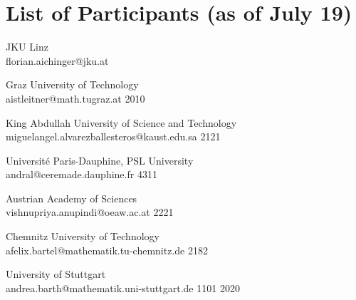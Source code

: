 \chapter{List of Participants (as of July 19)}
%
\setlength{\columnsep}{1cm}
\begin{multicols}{2}
\small\raggedright
%


 {JKU Linz\\}%
 {florian.aichinger@jku.at}%
 {} %
 {} %
 {} %
 {} %
 {} %

 {Graz University of Technology\\}%
 {aistleitner@math.tugraz.at}%
 {2010} %
 {} %
 {} %
 {} %
 {} %

 {King Abdullah University of Science and Technology\\}%
 {miguelangel.alvarezballesteros@kaust.edu.sa}%
 {2121} %
 {} %
 {} %
 {} %
 {} %

 {Universit\'{e} Paris-Dauphine, PSL University\\}%
 {andral@ceremade.dauphine.fr}%
 {4311} %
 {} %
 {} %
 {} %
 {} %

 {Austrian Academy of Sciences\\}%
 {vishnupriya.anupindi@oeaw.ac.at}%
 {2221} %
 {} %
 {} %
 {} %
 {} %

 {Chemnitz University of Technology\\}%
 {afelix.bartel@mathematik.tu-chemnitz.de}%
 {2182} %
 {} %
 {} %
 {} %
 {} %

 {University of Stuttgart\\}%
 {andrea.barth@mathematik.uni-stuttgart.de}%
 {1101} %
 {2020} %
 {} %
 {} %
 {} %


\end{multicols}
